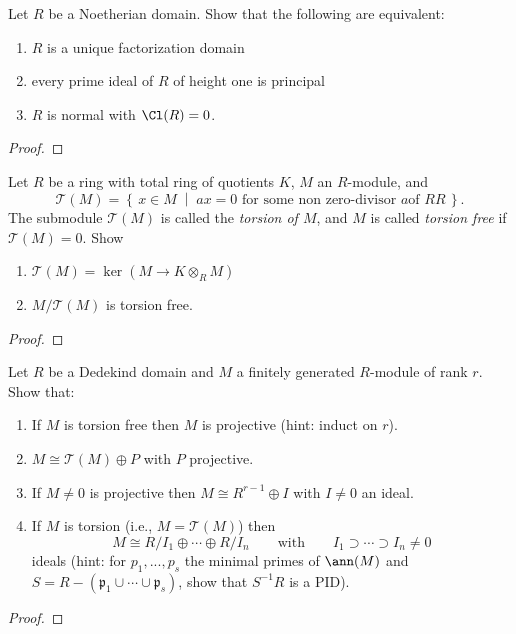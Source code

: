 \begin{problem}
Let $R$ be a Noetherian domain. Show that the following are equivalent:
\begin{enumerate}[label=(\roman*)]
\item $R$ is a unique factorization domain
\item every prime ideal of $R$ of height one is principal
\item $R$ is normal with $\Cl(R)=0$.
\end{enumerate}
\end{problem}
\begin{proof}
\end{proof}
\newpage
\begin{problem}
Let $R$ be a ring with total ring of quotients $K$, $M$ an $R$-module, and
\[
\mathcal{T}(M)=\left\{\,x\in M\;\middle|\;\text{$ax=0$ for some non zero-divisor $a$
    of $RR$}\,\right\}.
\]
The submodule $\mathcal{T}(M)$ is called the \emph{torsion of $M$}, and $M$ is called
\emph{torsion free} if $\mathcal{T}(M)=0$. Show
\begin{enumerate}[label=(\alph*)]
\item $\mathcal{T}(M)=\ker(M\to K\otimes_R M)$
\item $M/\mathcal{T}(M)$ is torsion free.
\end{enumerate}
\end{problem}
\begin{proof}
\end{proof}
\newpage
\begin{problem}
Let $R$ be a Dedekind domain and $M$ a finitely generated $R$-module of
rank $r$. Show that:
\begin{enumerate}[label=(\alph*)]
\item If $M$ is torsion free then $M$ is projective (hint: induct on $r$).
\item $M\cong \mathcal{T}(M)\oplus P$ with $P$ projective.
\item If $M\neq 0$ is projective then $M\cong R^{r-1}\oplus I$ with $I\neq
  0$ an ideal.
\item If $M$ is torsion (i.e., $M=\mathcal{T}(M)$) then
\[
M\cong R/I_1\oplus\cdots\oplus R/I_n\qquad\text{with}\qquad
I_1\supset\cdots\supset I_n\neq 0
\]
ideals (hint: for $p_1,...,p_s$ the minimal primes of $\ann(M)$ and
$S=R\minus(\mathfrak{p}_1\cup\cdots\cup\mathfrak{p}_s)$, show that
$S^{-1}R$ is a PID).
\end{enumerate}
\end{problem}
\begin{proof}
\end{proof}

